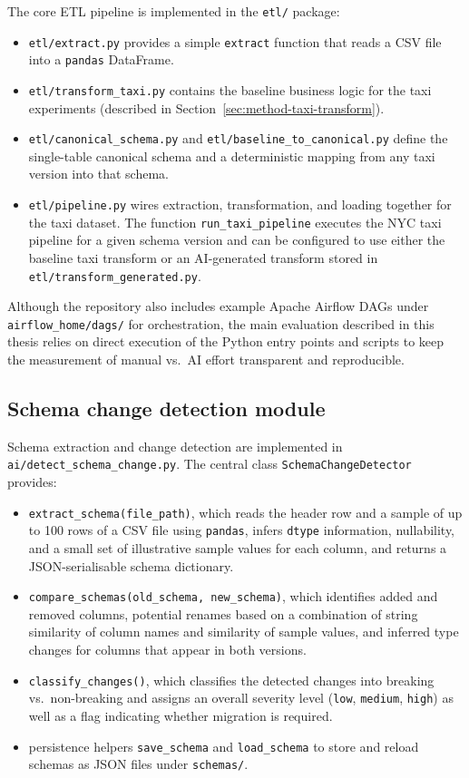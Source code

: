 The core ETL pipeline is implemented in the \texttt{etl/} package:
%
\begin{itemize}
  \item \texttt{etl/extract.py} provides a simple \texttt{extract} function
  that reads a CSV file into a \texttt{pandas} DataFrame.
  \item \texttt{etl/transform\_taxi.py} contains the baseline business logic
  for the taxi experiments (described in
  Section~\ref{sec:method-taxi-transform}).
  \item \texttt{etl/canonical\_schema.py} and
  \texttt{etl/baseline\_to\_canonical.py} define the single-table canonical
  schema and a deterministic mapping from any taxi version into that schema.
  \item \texttt{etl/pipeline.py} wires extraction, transformation, and loading
  together for the taxi dataset. The function \texttt{run\_taxi\_pipeline}
  executes the NYC taxi pipeline for a given schema version and can be
  configured to use either the baseline taxi transform or an AI-generated
  transform stored in \texttt{etl/transform\_generated.py}.
\end{itemize}

Although the repository also includes example Apache Airflow DAGs under
\texttt{airflow\_home/dags/} for orchestration, the main evaluation described
in this thesis relies on direct execution of the Python entry points and
scripts to keep the measurement of manual vs.\ AI effort transparent and
reproducible.


\subsection{Schema change detection module}
\label{sec:method-detection}

Schema extraction and change detection are implemented in
\texttt{ai/detect\_schema\_change.py}. The central class
\texttt{SchemaChangeDetector} provides:
%
\begin{itemize}
  \item \texttt{extract\_schema(file\_path)}, which reads the header row and a
  sample of up to 100 rows of a CSV file using \texttt{pandas}, infers
  \texttt{dtype} information, nullability, and a small set of illustrative
  sample values for each column, and returns a JSON-serialisable schema
  dictionary.
  \item \texttt{compare\_schemas(old\_schema, new\_schema)}, which identifies
  added and removed columns, potential renames based on a combination of string
  similarity of column names and similarity of sample values, and inferred type
  changes for columns that appear in both versions.
  \item \texttt{classify\_changes()}, which classifies the detected changes
  into breaking vs.\ non-breaking and assigns an overall severity level
  (\texttt{low}, \texttt{medium}, \texttt{high}) as well as a flag indicating
  whether migration is required.
  \item persistence helpers \texttt{save\_schema} and \texttt{load\_schema} to
  store and reload schemas as JSON files under \texttt{schemas/}.
\end{itemize}

